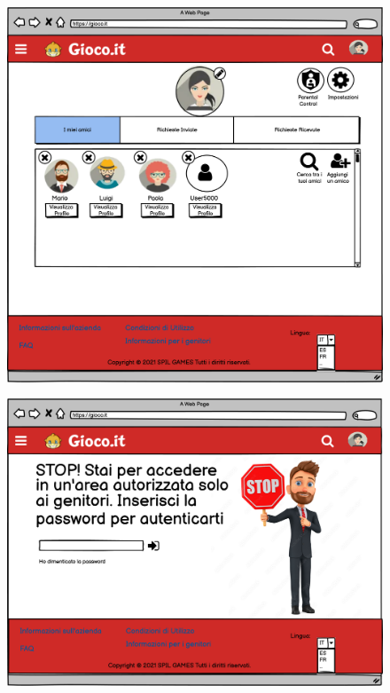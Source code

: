 \documentclass[../Report.tex]{subfiles}
\begin{document}
    \begin{figure}[H]
        \includegraphics[width=0.9\linewidth]{WAmici1 (Labeled).png}
        \centering
    \end{figure}

    \begin{figure}[H]
        \includegraphics[width=0.9\linewidth]{WParentalControlAcces (Whit Forgotten).png}
        \centering
    \end{figure}
\end{document}
